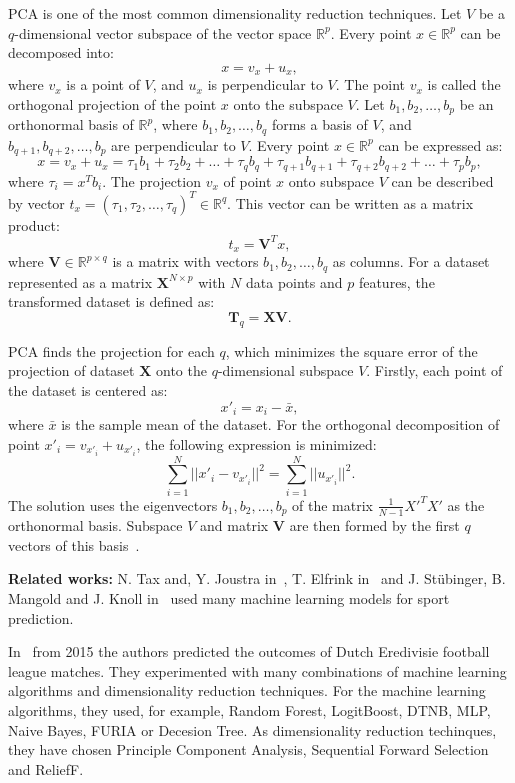 \documentclass[thesis=M,english]{FITthesis}[2019/12/23]
\begin{document}
PCA is one of the most common dimensionality reduction techniques. Let $V$ be a $q$-dimensional vector subspace of the vector space $\mathbb{R}^p$. Every point $x \in \mathbb{R}^p$ can be decomposed into: $$x = v_x + u_x,$$ where $v_x$ is a point of $V$, and $u_x$ is perpendicular to $V$. The point $v_x$ is called the orthogonal projection of the point $x$ onto the subspace $V$. Let $b_1, b_2, \dots, b_p$ be an orthonormal basis of $\mathbb{R}^p$, where $b_1, b_2, \dots, b_q$ forms a basis of $V$, and $b_{q+1}, b_{q+2}, \dots, b_p$ are perpendicular to $V$. Every point $x \in \mathbb{R}^p$ can be expressed as: $$x = v_x + u_x = \tau_1 b_1 + \tau_2 b_2 + \dots + \tau_q b_q + \tau_{q+1} b_{q+1} + \tau_{q+2} b_{q+2} + \dots + \tau_p b_p,$$ where $\tau_i = x^T b_i$. The projection $v_x$ of point $x$ onto subspace $V$ can be described by vector $t_x = (\tau_1, \tau_2, \dots, \tau_q)^T \in \mathbb{R}^q$. This vector can be written as a matrix product: $$t_x = \boldsymbol{V}^T x,$$ where $\boldsymbol{V} \in \mathbb{R}^{p \times q}$ is a matrix with vectors $b_1, b_2, \dots, b_q$ as columns. For a dataset represented as a matrix $\boldsymbol{X}^{N \times p}$ with $N$ data points and $p$ features, the transformed dataset is defined as: $$\boldsymbol{T}_q = \boldsymbol{X} \boldsymbol{V}.$$

PCA finds the projection for each $q$, which minimizes the square error of the projection of dataset $\boldsymbol{X}$ onto the $q$-dimensional subspace $V$. Firstly, each point of the dataset is centered as: $$x'_i = x_i - \bar{x},$$ where $\bar{x}$ is the sample mean of the dataset. For the orthogonal decomposition of point $x'_i = v_{x'_i} + u_{x'_i}$, the following expression is minimized: $$\sum_{i=1}^N ||x'_i - v_{x'_i}||^2 = \sum_{i=1}^N ||u_{x'_i}||^2.$$ The solution uses the eigenvectors $b_1, b_2, \dots, b_p$ of the matrix $\frac{1}{N-1}X'^T X'$ as the orthonormal basis. Subspace $V$ and matrix $\boldsymbol{V}$ are then formed by the first $q$ vectors of this basis~\cite{pca}.

 \noindent \textbf{Related works:} N. Tax and, Y. Joustra in~\cite{Dutch_football}, T. Elfrink in~\cite{MLB_regression} and J. Stübinger, B. Mangold and J. Knoll in~\cite{football_players} used many machine learning models for sport prediction.
 
 In~\cite{Dutch_football} from 2015 the authors predicted the outcomes of Dutch Eredivisie football league matches. They experimented with many combinations of machine learning algorithms and dimensionality reduction techniques. For the machine learning algorithms, they used, for example, Random Forest, LogitBoost, DTNB, MLP, Naive Bayes, FURIA or Decesion Tree. As dimensionality reduction techinques, they have chosen Principle Component Analysis, Sequential Forward Selection and ReliefF.
 
\end{document}
